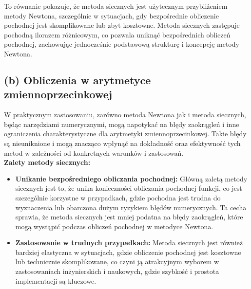 \documentclass{article}
\begin{document}
To równanie pokazuje, że metoda siecznych jest użytecznym przybliżeniem metody Newtona, szczególnie w sytuacjach, gdy bezpośrednie obliczenie pochodnej jest skomplikowane lub zbyt kosztowne. Metoda siecznych zastępuje pochodną ilorazem różnicowym, co pozwala uniknąć bezpośrednich obliczeń pochodnej, zachowując jednocześnie podstawową strukturę i koncepcję metody Newtona.

\newpage
\subsection*{(b) Obliczenia w arytmetyce zmiennoprzecinkowej}
W praktycznym zastosowaniu, zarówno metoda Newtona jak i metoda siecznych, będąc narzędziami numerycznymi, mogą napotykać na błędy zaokrągleń i inne ograniczenia charakterystyczne dla arytmetyki zmiennoprzecinkowej. Takie błędy są nieuniknione i mogą znacząco wpłynąć na dokładność oraz efektywność tych metod w zależności od konkretnych warunków i zastosowań.\\ 

\textbf{Zalety metody siecznych:}
\begin{itemize}
    \item {\bf Unikanie bezpośredniego obliczania pochodnej:} Główną zaletą metody siecznych jest to, że unika konieczności obliczania pochodnej funkcji, co jest szczególnie korzystne w przypadkach, gdzie pochodna jest trudna do wyznaczenia lub obarczona dużym ryzykiem błędów numerycznych. Ta cecha sprawia, że metoda siecznych jest mniej podatna na błędy zaokrągleń, które mogą wystąpić podczas obliczeń pochodnej w metodyce Newtona.
    \item {\bf Zastosowanie w trudnych przypadkach:} Metoda siecznych jest również bardziej elastyczna w sytuacjach, gdzie obliczenie pochodnej jest kosztowne lub technicznie skomplikowane, co czyni ją atrakcyjnym wyborem w zastosowaniach inżynierskich i naukowych, gdzie szybkość i prostota implementacji są kluczowe.
\end{itemize}
\end{document}

